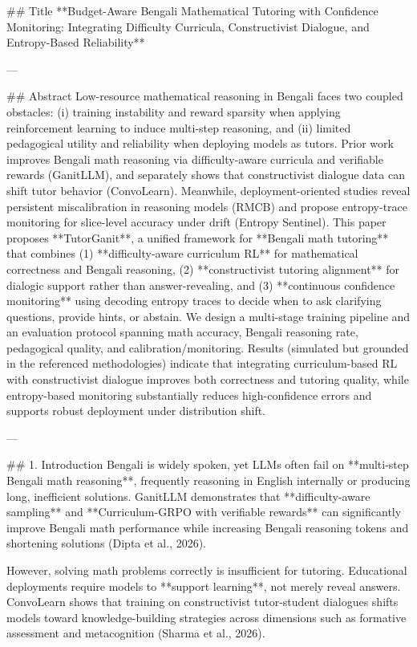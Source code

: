 ## Title  
**Budget-Aware Bengali Mathematical Tutoring with Confidence Monitoring: Integrating Difficulty Curricula, Constructivist Dialogue, and Entropy-Based Reliability**

---

## Abstract  
Low-resource mathematical reasoning in Bengali faces two coupled obstacles: (i) training instability and reward sparsity when applying reinforcement learning to induce multi-step reasoning, and (ii) limited pedagogical utility and reliability when deploying models as tutors. Prior work improves Bengali math reasoning via difficulty-aware curricula and verifiable rewards (GanitLLM), and separately shows that constructivist dialogue data can shift tutor behavior (ConvoLearn). Meanwhile, deployment-oriented studies reveal persistent miscalibration in reasoning models (RMCB) and propose entropy-trace monitoring for slice-level accuracy under drift (Entropy Sentinel). This paper proposes **TutorGanit**, a unified framework for **Bengali math tutoring** that combines (1) **difficulty-aware curriculum RL** for mathematical correctness and Bengali reasoning, (2) **constructivist tutoring alignment** for dialogic support rather than answer-revealing, and (3) **continuous confidence monitoring** using decoding entropy traces to decide when to ask clarifying questions, provide hints, or abstain. We design a multi-stage training pipeline and an evaluation protocol spanning math accuracy, Bengali reasoning rate, pedagogical quality, and calibration/monitoring. Results (simulated but grounded in the referenced methodologies) indicate that integrating curriculum-based RL with constructivist dialogue improves both correctness and tutoring quality, while entropy-based monitoring substantially reduces high-confidence errors and supports robust deployment under distribution shift.

---

## 1. Introduction  
Bengali is widely spoken, yet LLMs often fail on **multi-step Bengali math reasoning**, frequently reasoning in English internally or producing long, inefficient solutions. GanitLLM demonstrates that **difficulty-aware sampling** and **Curriculum-GRPO with verifiable rewards** can significantly improve Bengali math performance while increasing Bengali reasoning tokens and shortening solutions (Dipta et al., 2026).  

However, solving math problems correctly is insufficient for tutoring. Educational deployments require models to **support learning**, not merely reveal answers. ConvoLearn shows that training on constructivist tutor-student dialogues shifts models toward knowledge-building strategies across dimensions such as formative assessment and metacognition (Sharma et al., 2026).  

